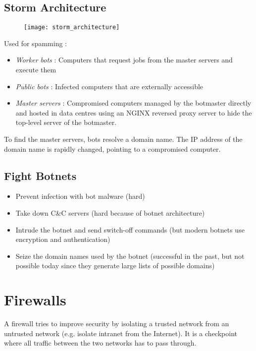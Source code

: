 \section{Storm Architecture}

\begin{figure}[H]
    \centering
    \texttt{[image: storm\_architecture]}
\end{figure}

Used for spamming :
\begin{itemize}
    \item \textit{Worker bots} : Computers that request jobs from the master servers and execute them
    \item \textit{Public bots} : Infected computers that are externally accessible
    \item \textit{Master servers} : Compromised computers managed by the botmaster directly and hosted in data centres using an NGINX reversed proxy server to hide the top-level server of the botmaster.
\end{itemize}

To find the master servers, bots resolve a domain name. The IP address of the domain name is rapidly changed, pointing to a compromised computer.

\section{Fight Botnets}

\begin{itemize}
    \item Prevent infection with bot malware (hard)
    \item Take down C\&C servers (hard because of botnet architecture)
    \item Intrude the botnet and send switch-off commands (but modern botnets use encryption and authentication)
    \item Seize the domain names used by the botnet (successful in the past, but not possible today since they generate large lists of possible domains)
\end{itemize}

\chapter{Firewalls}

A firewall tries to improve security by isolating a trusted network from an untrusted network (e.g. isolate intranet from the Internet). It is a checkpoint where all traffic between the two networks has to pass through.

